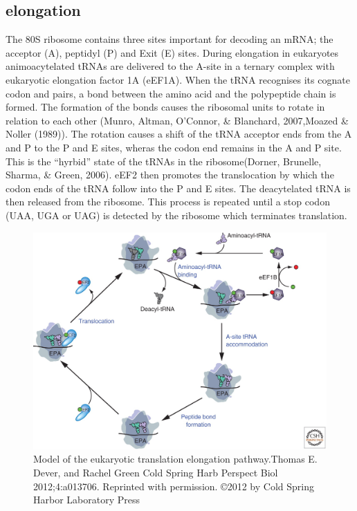 \documentclass[12pt,openany]{book}
\begin{document}
\subsection{elongation}

The 80S ribosome contains three sites important for decoding an mRNA;
the acceptor (A), peptidyl (P) and Exit (E) sites. During elongation in
eukaryotes animoacytelated tRNAs are delivered to the A-site in a
ternary complex with eukaryotic elongation factor 1A (eEF1A). When the
tRNA recognises its cognate codon and pairs, a bond between the amino
acid and the polypeptide chain is formed. The formation of the bonds
causes the ribosomal units to rotate in relation to each other (Munro,
Altman, O'Connor, \& Blanchard, 2007,Moazed \& Noller (1989)). The
rotation causes a shift of the tRNA acceptor ends from the A and P to
the P and E sites, wheras the codon end remains in the A and P site.
This is the ``hyrbid'' state of the tRNAs in the ribosome(Dorner,
Brunelle, Sharma, \& Green, 2006). eEF2 then promotes the translocation
by which the codon ends of the tRNA follow into the P and E sites. The
deacytelated tRNA is then released from the ribosome. This process is
repeated until a stop codon (UAA, UGA or UAG) is detected by the
ribosome which terminates translation.

\begin{figure}
  \includegraphics{./figures/elongation.jpg}
  \caption{Model of the eukaryotic translation elongation pathway.Thomas E. Dever, and Rachel Green Cold Spring Harb Perspect Biol 2012;4:a013706. Reprinted with permission. ©2012 by Cold Spring Harbor Laboratory Press
 \label{fig:elongation}}
\end{figure}
\end{document}
